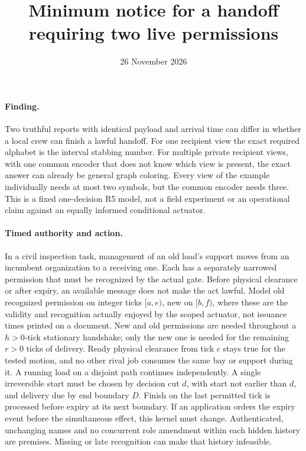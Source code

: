 \documentclass{article}
\title{Minimum notice for a handoff requiring two live permissions}
\date{26 November 2026}
\begin{document}
\maketitle
\paragraph{Finding.}
Two truthful reports with identical payload and arrival time can differ
in whether a local crew can finish a lawful handoff. For one recipient
view the exact required alphabet is the interval stabbing number.
For multiple private recipient views, with one common encoder that
does not know which view is present, the exact answer can already
be general graph coloring. Every view of the example individually
needs at most two symbols, but the common encoder needs three.
This is a fixed one-decision R5 model, not a field experiment or an
operational claim against an equally informed conditional actuator.

\paragraph{Timed authority and action.}
In a civil inspection task, management of an old load's support
moves from an incumbent organization to a receiving one. Each has a
separately narrowed permission that must be recognized by the actual
gate. Before physical clearance or after expiry, an available message
does not make the act lawful. Model old recognized permission on
integer ticks \([a,e)\), new on \([b,f)\), where these are the validity
and recognition actually enjoyed by the scoped actuator, not issuance
times printed on a document. New and old permissions are needed
throughout a \(h>0\)-tick stationary handshake; only the new one
is needed for the remaining \(r>0\) ticks of delivery.
Ready physical clearance from tick \(c\) stays true for the
tested motion, and no other rival job consumes the same bay or
support during it. A running load on a disjoint path continues
independently. A single irreversible start must be chosen by
decision cut \(d\), with start not earlier than \(d\), and delivery
due by end boundary \(D\). Finish on the last permitted tick
is processed before expiry at its next boundary. If an application
orders the expiry event before the simultaneous effect, this kernel
must change. Authenticated, unchanging names and no concurrent role
amendment within each hidden history are premises. Missing or late
recognition can make that history infeasible.
\end{document}
